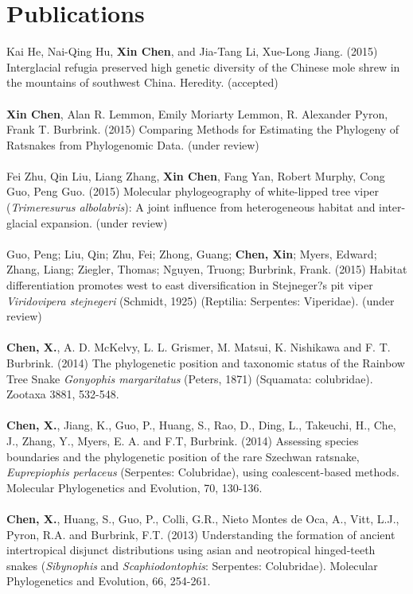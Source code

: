 \documentclass[12pt]{article}
\begin{document}
\section{Publications}
Kai He, Nai-Qing Hu, \textbf{Xin Chen}, and Jia-Tang Li, Xue-Long Jiang. (2015) Interglacial refugia preserved high genetic diversity of the Chinese mole shrew in the mountains of southwest China. Heredity. (accepted)\\
\\[-0.30\baselineskip]%
\textbf{Xin Chen}, Alan R. Lemmon, Emily Moriarty Lemmon, R. Alexander Pyron, Frank T. Burbrink. (2015) Comparing Methods for Estimating the Phylogeny of Ratsnakes from Phylogenomic Data. (under review)\\ 
\\[-0.30\baselineskip]%
Fei Zhu, Qin Liu, Liang Zhang, \textbf{Xin Chen}, Fang Yan, Robert Murphy, Cong Guo, Peng Guo. (2015) Molecular phylogeography of white-lipped tree viper (\textit{Trimeresurus albolabris}): A joint influence from heterogeneous habitat and inter-glacial expansion. (under review)\\
\\[-0.30\baselineskip]%
Guo, Peng; Liu, Qin; Zhu, Fei; Zhong, Guang; \textbf{Chen, Xin}; Myers, Edward; Zhang, Liang; Ziegler, Thomas; Nguyen, Truong; Burbrink, Frank. (2015) Habitat differentiation promotes west to east diversification in Stejneger?s pit viper \textit{Viridovipera stejnegeri} (Schmidt, 1925) (Reptilia: Serpentes: Viperidae). (under review)
\\
\\[-0.30\baselineskip]%
\textbf{Chen, X.}, A. D. McKelvy, L. L. Grismer, M. Matsui, K. Nishikawa and F. T. Burbrink. (2014)  The phylogenetic position and taxonomic status of the Rainbow Tree Snake \textit{Gonyophis margaritatus} (Peters, 1871) (Squamata: colubridae). Zootaxa 3881, 532-548.\\
\\[-0.30\baselineskip]%
\textbf{Chen, X.}, Jiang, K., Guo, P., Huang, S., Rao, D., Ding, L., Takeuchi, H., Che, J., Zhang, Y., Myers, E. A. and F.T, Burbrink. (2014) Assessing species boundaries and the phylogenetic position of the rare Szechwan ratsnake, \textit{Euprepiophis perlaceus} (Serpentes: Colubridae), using coalescent-based methods. Molecular Phylogenetics and Evolution, 70, 130-136.\\
\\[-0.30\baselineskip]%
\textbf{Chen, X.}, Huang, S., Guo, P., Colli, G.R., Nieto Montes de Oca, A., Vitt, L.J., Pyron, R.A. and Burbrink, F.T. (2013) Understanding the formation of ancient intertropical disjunct distributions using asian and neotropical hinged-teeth snakes (\textit{Sibynophis} and \textit{Scaphiodontophis}: Serpentes: Colubridae). Molecular Phylogenetics and Evolution, 66, 254-261.\\
\end{document}
